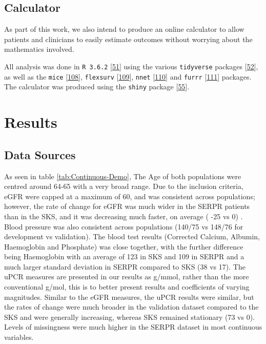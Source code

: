\documentclass[12pt,PhD,twoside,openright]{muthesis}
\begin{document}
\hypertarget{calculator}{%
\subsection{Calculator}\label{calculator}}

As part of this work, we also intend to produce an online calculator to allow patients and clinicians to easily estimate outcomes without worrying about the mathematics involved.

All analysis was done in \texttt{R\ 3.6.2} {[}\protect\hyperlink{ref-r_core_team_r_nodate}{51}{]} using the various \texttt{tidyverse} packages {[}\protect\hyperlink{ref-wickham_tidy_2017}{52}{]}, as well as the \texttt{mice} {[}\protect\hyperlink{ref-buuren_mice_2011-1}{108}{]}, \texttt{flexsurv} {[}\protect\hyperlink{ref-jackson_flexsurv_nodate}{109}{]}, \texttt{nnet} {[}\protect\hyperlink{ref-ripley_package_2016}{110}{]} and \texttt{furrr} {[}\protect\hyperlink{ref-vaughan_furrr_2018}{111}{]} packages. The calculator was produced using the \texttt{shiny} package {[}\protect\hyperlink{ref-chang_shiny_2020}{55}{]}.

\hypertarget{results-5}{%
\section{Results}\label{results-5}}

\hypertarget{data-sources-1}{%
\subsection{Data Sources}\label{data-sources-1}}

As seen in table \ref{tab:Continuous-Demo}, The Age of both populations were centred around 64-65 with a very broad range. Due to the inclusion criteria, eGFR were capped at a maximum of 60, and was consistent across populations; however, the rate of change for eGFR was much wider in the SERPR patients than in the SKS, and it was decreasing much faster, on average ( -25 vs 0) . Blood pressure was also consistent across populations (140/75 vs 148/76 for development vs validation). The blood test results (Corrected Calcium, Albumin, Haemoglobin and Phosphate) was close together, with the further difference being Haemoglobin with an average of 123 in SKS and 109 in SERPR and a much larger standard deviation in SERPR compared to SKS (38 vs 17). The uPCR measures are presented in our results as g/mmol, rather than the more conventional g/mol, this is to better present results and coefficients of varying magnitudes. Similar to the eGFR measures, the uPCR results were similar, but the rates of change were much broader in the validation dataset compared to the SKS and were generally increasing, whereas SKS remained stationary (73 vs 0). Levels of missingness were much higher in the SERPR dataset in most continuous variables.
\end{document}
